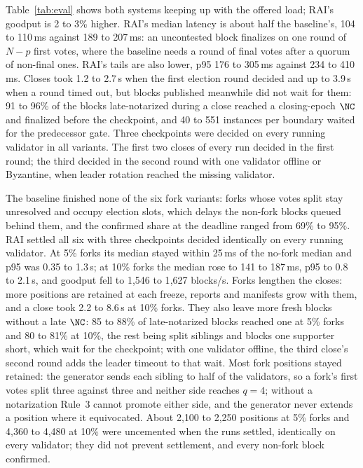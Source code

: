 Table~\ref{tab:eval} shows both systems keeping up with the offered load; RAI's goodput is 2 to 3\% higher. RAI's median latency is about half the baseline's, 104 to 110\,ms against 189 to 207\,ms: an uncontested block finalizes on one round of $N-p$ first votes, where the baseline needs a round of final votes after a quorum of non-final ones. RAI's tails are also lower, p95 176 to 305\,ms against 234 to 410\,ms. Closes took 1.2 to 2.7\,s when the first election round decided and up to 3.9\,s when a round timed out, but blocks published meanwhile did not wait for them: 91 to 96\% of the blocks late-notarized during a close reached a closing-epoch $\NC$ and finalized before the checkpoint, and 40 to 551 instances per boundary waited for the predecessor gate. Three checkpoints were decided on every running validator in all variants. The first two closes of every run decided in the first round; the third decided in the second round with one validator offline or Byzantine, when leader rotation reached the missing validator.

The baseline finished none of the six fork variants: forks whose votes split stay unresolved and occupy election slots, which delays the non-fork blocks queued behind them, and the confirmed share at the deadline ranged from 69\% to 95\%. RAI settled all six with three checkpoints decided identically on every running validator. At 5\% forks its median stayed within 25\,ms of the no-fork median and p95 was 0.35 to 1.3\,s; at 10\% forks the median rose to 141 to 187\,ms, p95 to 0.8 to 2.1\,s, and goodput fell to 1{,}546 to 1{,}627 blocks/s. Forks lengthen the closes: more positions are retained at each freeze, reports and manifests grow with them, and a close took 2.2 to 8.6\,s at 10\% forks. They also leave more fresh blocks without a late $\NC$: 85 to 88\% of late-notarized blocks reached one at 5\% forks and 80 to 81\% at 10\%, the rest being split siblings and blocks one supporter short, which wait for the checkpoint; with one validator offline, the third close's second round adds the leader timeout to that wait. Most fork positions stayed retained: the generator sends each sibling to half of the validators, so a fork's first votes split three against three and neither side reaches $q=4$; without a notarization Rule~3 cannot promote either side, and the generator never extends a position where it equivocated. About 2{,}100 to 2{,}250 positions at 5\% forks and 4{,}360 to 4{,}480 at 10\% were uncemented when the runs settled, identically on every validator; they did not prevent settlement, and every non-fork block confirmed.

